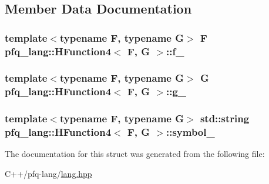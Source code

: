 \subsection{Member Data Documentation}
\hypertarget{structpfq__lang_1_1HFunction4_a4a05b28c32d35ba19353d5c7fe028aa0}{
\subsubsection[{f\+\_\+}]{\setlength{\rightskip}{0pt plus 5cm}template$<$typename F, typename G$>$ F {\bf pfq\+\_\+lang\+::\+H\+Function4}$<$ F, G $>$\+::f\+\_\+}}\label{structpfq__lang_1_1HFunction4_a4a05b28c32d35ba19353d5c7fe028aa0}
\hypertarget{structpfq__lang_1_1HFunction4_ad7cf948fb1775430924e0a46dece3d12}{
\subsubsection[{g\+\_\+}]{\setlength{\rightskip}{0pt plus 5cm}template$<$typename F, typename G$>$ G {\bf pfq\+\_\+lang\+::\+H\+Function4}$<$ F, G $>$\+::g\+\_\+}}\label{structpfq__lang_1_1HFunction4_ad7cf948fb1775430924e0a46dece3d12}
\hypertarget{structpfq__lang_1_1HFunction4_ad58dbdba4ab08dc0d78cce96f16b02c5}{
\subsubsection[{symbol\+\_\+}]{\setlength{\rightskip}{0pt plus 5cm}template$<$typename F, typename G$>$ std\+::string {\bf pfq\+\_\+lang\+::\+H\+Function4}$<$ F, G $>$\+::symbol\+\_\+}}\label{structpfq__lang_1_1HFunction4_ad58dbdba4ab08dc0d78cce96f16b02c5}


The documentation for this struct was generated from the following file\+:\begin{DoxyCompactItemize}
\item 
C++/pfq-\/lang/\hyperlink{lang_8hpp}{lang.\+hpp}\end{DoxyCompactItemize}
